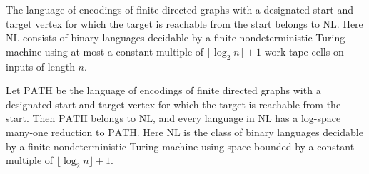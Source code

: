 \begin{theorem}
\label{Complexity.PATH_mem_NL}
\leanok
{}
The language of encodings of finite directed graphs with a designated start and target
vertex for which the target is reachable from the start belongs to $\mathrm{NL}$. Here
$\mathrm{NL}$ consists of binary languages decidable by a finite nondeterministic Turing
machine using at most a constant multiple of $\lfloor\log_2 n\rfloor+1$ work-tape cells
on inputs of length $n$.
\end{theorem}

\begin{theorem}
\label{Complexity.PATH_NLComplete}
\leanok
{}
Let $\mathrm{PATH}$ be the language of encodings of finite directed graphs with a
designated start and target vertex for which the target is reachable from the start.
Then $\mathrm{PATH}$ belongs to $\mathrm{NL}$, and every language in $\mathrm{NL}$ has a
log-space many-one reduction to $\mathrm{PATH}$. Here $\mathrm{NL}$ is the class of
binary languages decidable by a finite nondeterministic Turing machine using space
bounded by a constant multiple of $\lfloor\log_2 n\rfloor+1$.
\end{theorem}

